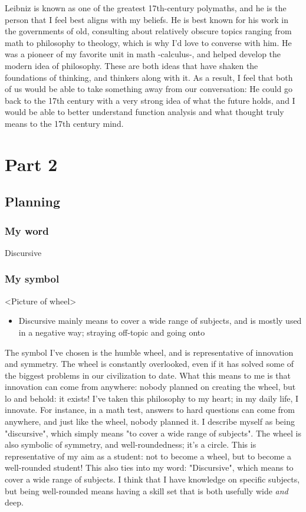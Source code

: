 \documentclass[]{article}
\begin{document}
Leibniz is known as one of the greatest 17th-century polymaths, and he is the person that I feel best aligns with my beliefs. He is best known for his work in the governments of old, consulting about relatively obscure topics ranging from math to philosophy to theology, which is why I'd love to converse with him. 
He was a pioneer of my favorite unit in math -calculus-, and helped develop the modern idea of philosophy. These are both ideas that have shaken the foundations of thinking, and thinkers along with it. As a result, I feel that both of us would be able to take something away from our conversation: He could go back to the 17th century with a very strong idea of what the future holds, and I would be able to better understand function analysis and what thought truly means to the 17\textup{th} century mind.


\section*{Part 2}
\subsection*{Planning}
\subsubsection*{My word}
Discursive
\subsubsection*{My symbol}
<Picture of wheel>

\begin{itemize}
    \item Discursive mainly means to cover a wide range of subjects, and is mostly used in a negative way; straying off-topic and going onto 
\end{itemize}

The symbol I've chosen is the humble wheel, and is representative of innovation and symmetry. The wheel is constantly overlooked, even if it has solved some of the biggest problems in our civilization to date. What this means to me is that innovation can come from anywhere: nobody planned on creating the wheel, but lo and behold: it exists! I've taken this philosophy to my heart; in my daily life, I innovate. For instance, in a math test, answers to hard questions can come from anywhere, and just like the wheel, nobody planned it. I describe myself as being "discursive", which simply means "to cover a wide range of subjects". The wheel is also symbolic of symmetry, and well-roundedness; it's a circle. This is representative of my aim as a student: not to become a wheel, but to become a well-rounded student! This also ties into my word: "Discursive", which means to cover a wide range of subjects. I think that I have knowledge on specific subjects, but being well-rounded means having a skill set that is both usefully wide \textit{and} deep.
\end{document}
